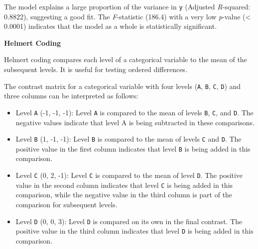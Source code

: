 \documentclass[
  letterpaper,
]{book}
\newenvironment{Shaded}{\begin{snugshade}}{\end{snugshade}}
\newcommand{\CommentTok}[1]{\textcolor[rgb]{0.37,0.37,0.37}{#1}}
\newcommand{\DecValTok}[1]{\textcolor[rgb]{0.68,0.00,0.00}{#1}}
\newcommand{\FunctionTok}[1]{\textcolor[rgb]{0.28,0.35,0.67}{#1}}
\newcommand{\NormalTok}[1]{\textcolor[rgb]{0.00,0.23,0.31}{#1}}
\newcommand{\OtherTok}[1]{\textcolor[rgb]{0.00,0.23,0.31}{#1}}
\newcommand{\SpecialCharTok}[1]{\textcolor[rgb]{0.37,0.37,0.37}{#1}}
\providecommand{\tightlist}{%
  \setlength{\itemsep}{0pt}\setlength{\parskip}{0pt}}\usepackage{longtable,booktabs,array}
\begin{document}
The model explains a large proportion of the variance in \texttt{y}
(Adjusted \emph{R}-squared: 0.8822), suggesting a good fit. The
\emph{F}-statistic (186.4) with a very low \emph{p}-value (\textless{}
0.0001) indicates that the model as a whole is statistically
significant.

\textbf{Helmert Coding}

Helmert coding compares each level of a categorical variable to the mean
of the subsequent levels. It is useful for testing ordered differences.

\begin{Shaded}
\end{Shaded}

The contrast matrix for a categorical variable with four levels
(\texttt{A}, \texttt{B}, \texttt{C}, \texttt{D}) and three columns can
be interpreted as follows:

\begin{itemize}
\tightlist
\item
  Level \texttt{A} (-1, -1, -1): Level \texttt{A} is compared to the
  mean of levels \texttt{B}, \texttt{C}, and \texttt{D}. The negative
  values indicate that level A is being subtracted in these comparisons.
\item
  Level \texttt{B} (1, -1, -1): Level \texttt{B} is compared to the mean
  of levels \texttt{C} and \texttt{D}. The positive value in the first
  column indicates that level \texttt{B} is being added in this
  comparison.
\item
  Level \texttt{C} (0, 2, -1): Level \texttt{C} is compared to the mean
  of level \texttt{D}. The positive value in the second column indicates
  that level \texttt{C} is being added in this comparison, while the
  negative value in the third column is part of the comparison for
  subsequent levels.
\item
  Level \texttt{D} (0, 0, 3): Level \texttt{D} is compared on its own in
  the final contrast. The positive value in the third column indicates
  that level \texttt{D} is being added in this comparison.
\end{itemize}
\end{document}
